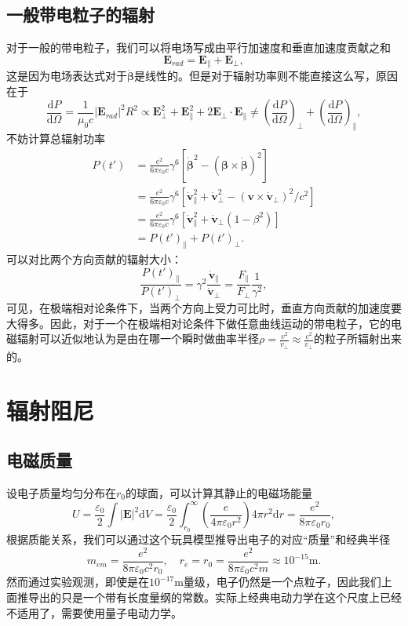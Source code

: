 \documentclass[UTF8]{ctexbook}
\renewcommand{\d}{\mathrm{d}}
\renewcommand{\b}{\boldsymbol}
\numberwithin{equation}{chapter}
\begin{document}
	\subsection{一般带电粒子的辐射}
	对于一般的带电粒子，我们可以将电场写成由平行加速度和垂直加速度贡献之和
	\[\b{E}_{rad}=\b{E}_{\parallel}+\b{E}_{\perp},\]
	这是因为电场表达式对于$\dot{\b{\beta}}$是线性的。但是对于辐射功率则不能直接这么写，原因在于
	\[\frac{\d P}{\d \Omega}=\frac{1}{\mu_0 c}|\b{E}_{rad}|^2 R^2 \propto \b{E}_{\perp}^2+\b{E}_{\parallel}^2+2\b{E}_{\perp}\cdot\b{E}_{\parallel} \neq \left(\frac{\d P}{\d\Omega}\right)_\perp+\left(\frac{\d P}{\d\Omega}\right)_\parallel,\]
	不妨计算总辐射功率
	\begin{align*}
		P(t')&= \frac{e^2}{6\pi\varepsilon_0c}\gamma^6[\dot{\b{\beta}}^2-(\b{\beta}\times\dot{\b{\beta}})^2] \\
		&=\frac{e^2}{6\pi\varepsilon_0 c}\gamma^6 [\dot{\b{v}}_\parallel^2+\dot{\b{v}}_\perp^2-(\b{v}\times\dot{\b{v}}_\perp)^2/c^2]\\
		&=\frac{e^2}{6\pi\varepsilon_0 c}\gamma^6 [\dot{\b{v}}_\parallel^2+\dot{\b{v}}_\perp(1-\beta^2)] \\
		&=P(t')_\parallel+P(t')_\perp.
	\end{align*}
	可以对比两个方向贡献的辐射大小：
	\[\frac{P(t')_\parallel}{P(t')_\perp}=\gamma^2\frac{\dot{\b{v}}_\parallel}{\dot{\b{v}}_\perp}=\frac{F_{\parallel}}{F_{\perp}}\frac{1}{\gamma^2},\]
	可见，在极端相对论条件下，当两个方向上受力可比时，垂直方向贡献的加速度要大得多。因此，对于一个在极端相对论条件下做任意曲线运动的带电粒子，它的电磁辐射可以近似地认为是由在哪一个瞬时做曲率半径$\rho=\frac{v^2}{\dot{v}_\perp}\approx \frac{c^2}{\dot{v}_\perp}$的粒子所辐射出来的。
	
	\section{辐射阻尼}
	
	\subsection{电磁质量}
	设电子质量均匀分布在$r_0$的球面，可以计算其静止的电磁场能量
	\[U=\frac{\varepsilon_0}{2}\int|\b{E}|^2\d V=\frac{\varepsilon_0}{2}\int_{r_0}^\infty \left(\frac{e}{4\pi\varepsilon_0r^2}\right)4\pi r^2\d r=\frac{e^2}{8\pi\varepsilon_0 r_0},\]
	根据质能关系，我们可以通过这个玩具模型推导出电子的对应“质量”和经典半径
	\[m_{em}=\frac{e^2}{8\pi\varepsilon_0 c^2 r_0},\quad r_e=r_0=\frac{e^2}{8\pi\varepsilon_0 c^2 m}\approx 10^{-15}\mathrm{m}.\]
	然而通过实验观测，即使是在$10^{-17}$m量级，电子仍然是一个点粒子，因此我们上面推导出的只是一个带有长度量纲的常数。实际上经典电动力学在这个尺度上已经不适用了，需要使用量子电动力学。
	
\end{document}
